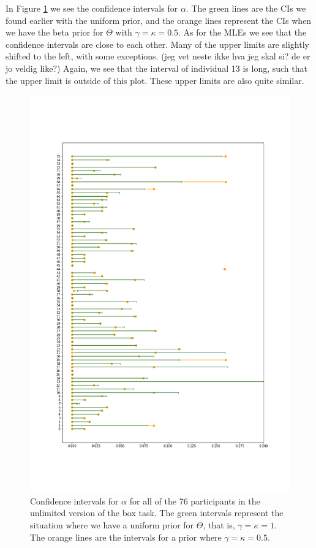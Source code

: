 In Figure \ref{fig:sensitivity_unlim_cis_alpha} we see the confidence intervals for $\alpha$. The green lines are the CIs we found earlier with the uniform prior, and the orange lines represent the CIs when we have the beta prior for $\Theta$ with $\gamma=\kappa=0.5$. As for the MLEs we see that the confidence intervals are close to each other. Many of the upper limits are slightly shifted to the left, with some exceptions. (jeg vet neste ikke hva jeg skal si? de er jo veldig like?) Again, we see that the interval of individual 13 is long, such that the upper limit is outside of this plot. These upper limits are also quite similar. 
\begin{figure}
    \centering
    \includegraphics[scale=0.37]{pictures/Sensitivity/ci_unlim_alpha.png}
    \caption[CIs for $\alpha$ for all participants with two different priors, unlimited]{
    Confidence intervals for $\alpha$ for all of the 76 participants in the unlimited version of the box task. The green intervals represent the situation where we have a uniform prior for $\Theta$, that is, $\gamma=\kappa=1$. The orange lines are the intervals for a prior where $\gamma=\kappa=0.5$.}
    \label{fig:sensitivity_unlim_cis_alpha}
\end{figure}


